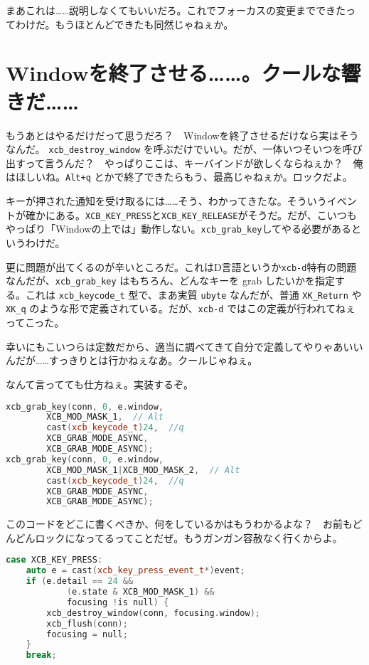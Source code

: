 \documentclass[12pt,a4paper]{jsarticle}
\begin{document}
まあこれは……説明しなくてもいいだろ。これでフォーカスの変更までできたってわけだ。もうほとんどできたも同然じゃねぇか。

\section{Windowを終了させる……。クールな響きだ……}

もうあとはやるだけだって思うだろ？　Windowを終了させるだけなら実はそうなんだ。 \lstinline{xcb_destroy_window} を呼ぶだけでいい。だが、一体いつそいつを呼び出すって言うんだ？　やっぱりここは、キーバインドが欲しくならねぇか？　俺はほしいね。\lstinline{Alt+q} とかで終了できたらもう、最高じゃねぇか。ロックだよ。

キーが押された通知を受け取るには……そう、わかってきたな。そういうイベントが確かにある。\lstinline{XCB_KEY_PRESS}と\lstinline{XCB_KEY_RELEASE}がそうだ。だが、こいつもやっぱり「Windowの上では」動作しない。\lstinline{xcb_grab_key}してやる必要があるというわけだ。

更に問題が出てくるのが辛いところだ。これはD言語というか\lstinline{xcb-d}特有の問題なんだが、\lstinline{xcb_grab_key} はもちろん、どんなキーを grab したいかを指定する。これは \lstinline{xcb_keycode_t} 型で、まあ実質 \lstinline{ubyte} なんだが、普通 \lstinline{XK_Return} や \lstinline{XK_q} のような形で定義されている。だが、\lstinline{xcb-d} ではこの定義が行われてねぇってこった。

幸いにもこいつらは定数だから、適当に調べてきて自分で定義してやりゃあいいんだが……すっきりとは行かねぇなあ。クールじゃねぇ。

なんて言ってても仕方ねぇ。実装するぞ。

\begin{lstlisting}[language=C++]
xcb_grab_key(conn, 0, e.window,
		XCB_MOD_MASK_1,  // Alt
		cast(xcb_keycode_t)24,  //q
		XCB_GRAB_MODE_ASYNC,
		XCB_GRAB_MODE_ASYNC);
xcb_grab_key(conn, 0, e.window,
		XCB_MOD_MASK_1|XCB_MOD_MASK_2,  // Alt
		cast(xcb_keycode_t)24,  //q
		XCB_GRAB_MODE_ASYNC,
		XCB_GRAB_MODE_ASYNC);
\end{lstlisting}


このコードをどこに書くべきか、何をしているかはもうわかるよな？　お前もどんどんロックになってるってことだぜ。もうガンガン容赦なく行くからよ。

\begin{lstlisting}[language=C++]
case XCB_KEY_PRESS:
	auto e = cast(xcb_key_press_event_t*)event;
	if (e.detail == 24 &&
			(e.state & XCB_MOD_MASK_1) &&
			focusing !is null) {
		xcb_destroy_window(conn, focusing.window);
		xcb_flush(conn);
		focusing = null;
	}
	break;
\end{lstlisting}
\end{document}
